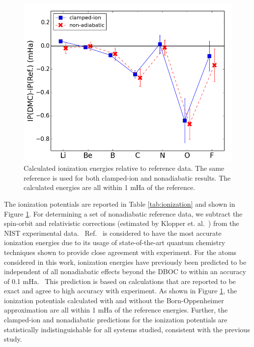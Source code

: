 \documentclass[aip,jcp,numerical,reprint]{revtex4-1}
\begin{document}
\begin{figure}[h]
\centering
\includegraphics[scale=.37]{ionization}
\caption{Calculated ionization energies relative to reference data. The same reference is used for both clamped-ion and nonadiabatic results. The calculated energies are all within 1 mHa of the reference. \label{fig:ionization}}
\end{figure}

The ionization potentials are reported in Table \ref{tab:ionization} and shown in Figure \ref{fig:ionization}. For determining a set of nonadiabatic reference data, we subtract the spin-orbit and relativistic corrections (estimated by Klopper et. al.~\cite{Klopper_IP}) from the NIST experimental data.~\cite{NIST_Atoms} Ref.~\cite{Klopper_IP} is considered to have the most accurate ionization energies due to its usage of state-of-the-art quantum chemistry techniques shown to provide close agreement with experiment.
For the atoms considered in this work, ionization energies have previously been predicted to be independent of all nonadiabatic effects beyond the DBOC to within an accuracy of 0.1 mHa.~\cite{Klopper_IP} This prediction is based on calculations that are reported to be exact and agree to high accuracy with experiment. As shown in Figure \ref{fig:ionization}, the ionization potentials calculated with and without the Born-Oppenheimer approximation are all within 1 mHa of the reference energies. Further, the clamped-ion and nonadiabatic predictions for the ionization potentials are statistically indistinguishable for all systems studied, consistent with the previous study.~\cite{Klopper_IP}
\end{document}

